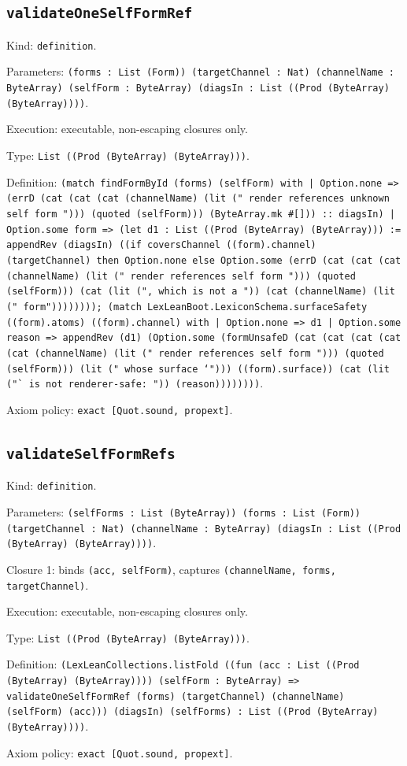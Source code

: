 \documentclass[11pt]{article}
\begin{document}
\subsection*{\texttt{validateOneSelfFormRef}}
\noindent Kind: \texttt{definition}.\par
\noindent Parameters: \texttt{(forms : List (Form)) (targetChannel : Nat) (channelName : ByteArray) (selfForm : ByteArray) (diagsIn : List ((Prod (ByteArray) (ByteArray))))}.\par
\noindent Execution: executable, non-escaping closures only.\par
\noindent Type: \texttt{List ((Prod (ByteArray) (ByteArray)))}.\par
\noindent Definition: \texttt{(match findFormById (forms) (selfForm) with | Option.none => (errD (cat (cat (cat (channelName) (lit (" render references unknown self form "))) (quoted (selfForm))) (ByteArray.mk \#[])) :: diagsIn) | Option.some form => (let d1 : List ((Prod (ByteArray) (ByteArray))) := appendRev (diagsIn) ((if coversChannel ((form).channel) (targetChannel) then Option.none else Option.some (errD (cat (cat (cat (channelName) (lit (" render references self form "))) (quoted (selfForm))) (cat (lit (", which is not a ")) (cat (channelName) (lit (" form")))))))); (match LexLeanBoot.LexiconSchema.surfaceSafety ((form).atoms) ((form).channel) with | Option.none => d1 | Option.some reason => appendRev (d1) (Option.some (formUnsafeD (cat (cat (cat (cat (cat (channelName) (lit (" render references self form "))) (quoted (selfForm))) (lit (" whose surface `"))) ((form).surface)) (cat (lit ("` is not renderer-safe: ")) (reason))))))))}.\par
\noindent Axiom policy: \texttt{exact [Quot.sound, propext]}.\par
\subsection*{\texttt{validateSelfFormRefs}}
\noindent Kind: \texttt{definition}.\par
\noindent Parameters: \texttt{(selfForms : List (ByteArray)) (forms : List (Form)) (targetChannel : Nat) (channelName : ByteArray) (diagsIn : List ((Prod (ByteArray) (ByteArray))))}.\par
\noindent Closure 1: binds \texttt{(acc, selfForm)}, captures \texttt{(channelName, forms, targetChannel)}.\par
\noindent Execution: executable, non-escaping closures only.\par
\noindent Type: \texttt{List ((Prod (ByteArray) (ByteArray)))}.\par
\noindent Definition: \texttt{(LexLeanCollections.listFold ((fun (acc : List ((Prod (ByteArray) (ByteArray)))) (selfForm : ByteArray) => validateOneSelfFormRef (forms) (targetChannel) (channelName) (selfForm) (acc))) (diagsIn) (selfForms) : List ((Prod (ByteArray) (ByteArray))))}.\par
\noindent Axiom policy: \texttt{exact [Quot.sound, propext]}.\par
\end{document}
